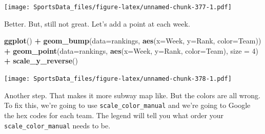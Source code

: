\documentclass[
]{book}
\newenvironment{Shaded}{\begin{snugshade}}{\end{snugshade}}
\newcommand{\DataTypeTok}[1]{\textcolor[rgb]{0.13,0.29,0.53}{#1}}
\newcommand{\DecValTok}[1]{\textcolor[rgb]{0.00,0.00,0.81}{#1}}
\newcommand{\KeywordTok}[1]{\textcolor[rgb]{0.13,0.29,0.53}{\textbf{#1}}}
\newcommand{\NormalTok}[1]{#1}
\newcommand{\OperatorTok}[1]{\textcolor[rgb]{0.81,0.36,0.00}{\textbf{#1}}}
\newcommand{\StringTok}[1]{\textcolor[rgb]{0.31,0.60,0.02}{#1}}
\begin{document}
\texttt{[image: SportsData\_files/figure-latex/unnamed-chunk-377-1.pdf]}

Better. But, still not great. Let's add a point at each week.

\begin{Shaded}
\begin{Highlighting}[]
\KeywordTok{ggplot}\NormalTok{() }\OperatorTok{+}\StringTok{ }
\StringTok{  }\KeywordTok{geom_bump}\NormalTok{(}\DataTypeTok{data=}\NormalTok{rankings, }\KeywordTok{aes}\NormalTok{(}\DataTypeTok{x=}\NormalTok{Week, }\DataTypeTok{y=}\NormalTok{Rank, }\DataTypeTok{color=}\NormalTok{Team)) }\OperatorTok{+}\StringTok{ }
\StringTok{  }\KeywordTok{geom_point}\NormalTok{(}\DataTypeTok{data=}\NormalTok{rankings, }\KeywordTok{aes}\NormalTok{(}\DataTypeTok{x=}\NormalTok{Week, }\DataTypeTok{y=}\NormalTok{Rank, }\DataTypeTok{color=}\NormalTok{Team), }\DataTypeTok{size =} \DecValTok{4}\NormalTok{) }\OperatorTok{+}
\StringTok{  }\KeywordTok{scale_y_reverse}\NormalTok{() }
\end{Highlighting}
\end{Shaded}

\texttt{[image: SportsData\_files/figure-latex/unnamed-chunk-378-1.pdf]}

Another step. That makes it more subway map like. But the colors are all wrong. To fix this, we're going to use \texttt{scale\_color\_manual} and we're going to Google the hex codes for each team. The legend will tell you what order your \texttt{scale\_color\_manual} needs to be.

\begin{Shaded}
\end{Shaded}
\end{document}
